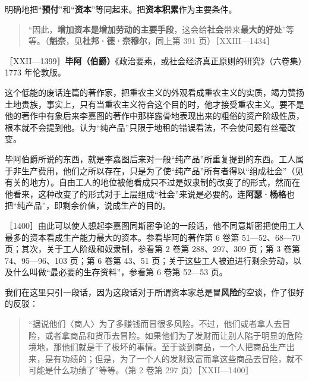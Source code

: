 明确地把“\textbf{预付}”和“\textbf{资本}”等同起来。把\textbf{资本积累}作为主要条件。

\begin{quote}“因此，\textbf{增加资本是增加劳动的主要手段}，这会给\textbf{社会}带来\textbf{最大的好处}”等等。（\textbf{魁奈}，见\textbf{杜邦·德·奈穆尔}，同上第 391 页）［XXIII—1434］\end{quote}


［XXII—1399］\textbf{毕阿（伯爵）}《政治要素，或社会经济真正原则的研究》（六卷集）1773 年伦敦版。

这个低能的废话连篇的著作家，把重农主义的外观看成重农主义的实质，竭力赞扬土地贵族，事实上，只有当重农主义符合这个目的时，他才接受重农主义。要不是他的著作中有象后来李嘉图的著作中那样露骨地表现出来的粗俗的资产阶级性质，根本就不会提到他。认为“纯产品”只限于地租的错误看法，不会使问题有丝毫改变。

毕阿伯爵所说的东西，就是李嘉图后来对一般“纯产品”所重复提到的东西。工人属于非生产费用，他们之所以存在，只是为了使“纯产品”所有者得以“组成社会”（见有关的地方）。自由工人的地位被他看成只不过是奴隶制的改变了的形式，然而在他看来，这种改变了的形式对于上层组成“社会”来说是必要的。\fontbox{~\{}连\textbf{阿瑟·杨格}也把“纯产品”，即剩余价值，说成生产的目的。\fontbox{\}~}

［1400］由此可以使人想起李嘉图同斯密争论的一段话，他不同意斯密把使用工人最多的资本看成生产能力最大的资本。参看毕阿的著作第 6 卷第 51—52、68—70 页；其次，关于工人阶级和奴隶制，参看第 2 卷第 288、297、309 页；第 3 卷第 74、95—96、103 页；第 6 卷第 43、51 页；关于这些工人被迫进行剩余劳动，以及什么叫做“最必要的生存资料”，参看第 6 卷第 52—53 页。

我们在这里只引一段话，因为这段话对于所谓资本家总是冒\textbf{风险}的空谈，作了很好的反驳：

\begin{quote}“据说他们〈商人〉为了多赚钱而冒很多风险。不过，他们或者拿人去冒险，或者拿商品和货币去冒险。如果他们为了发财而让别人陷于明显的危险境地，那他们就是干了极坏的事情。至于谈到商品，一个人把商品生产出来，是有功绩的；但是，为了一个人的发财致富而拿这些商品去冒险，就不可能是什么功绩了”等等。（第 2 卷第 297 页）［XXII—1400］\end{quote}


